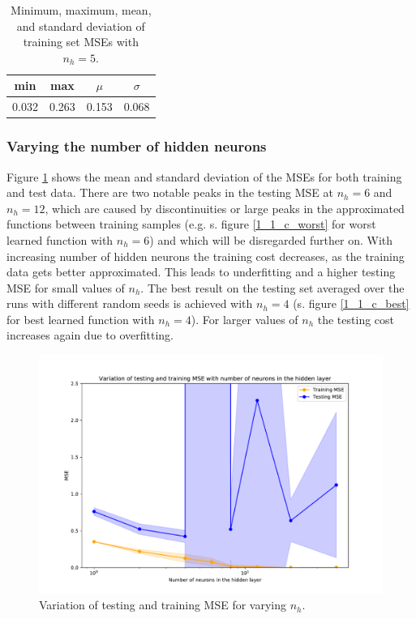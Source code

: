 \documentclass{article}
\begin{document}
\begin{table}[!ht]
\centering
\begin{tabular}{|c|c|c|c|} \hline
min & max 	& $\mu$ 	& $\sigma$ \\ \hline
0.032	& 0.263		& 0.153		& 0.068  \\ \hline
\end{tabular}
\caption{Minimum, maximum, mean, and standard deviation of training set MSEs with $n_h=5$.}
\label{1_1_b}
\end{table}

\clearpage

\subsubsection{Varying the number of hidden neurons}

Figure \ref{1_1_c_mse} shows the mean and standard deviation of the MSEs for both training and test data. There are two notable peaks in the testing MSE at $n_h=6$ and $n_h=12$, which are caused by discontinuities or large peaks in the approximated functions between training samples (e.g. s. figure \ref{1_1_c_worst} for worst learned function with $n_h=6$) and which will be disregarded further on. With increasing number of hidden neurons the training cost decreases, as the training data gets better approximated. This leads to underfitting and a higher testing MSE for small values of $n_h$. The best result on the testing set averaged over the runs with different random seeds is achieved with $n_h=4$ (s. figure \ref{1_1_c_best} for best learned function with $n_h=4$). For larger values of $n_h$ the testing cost increases again due to overfitting.

\begin{figure}[!ht]
\centering
\includegraphics[width=\textwidth]{./Figures/1_1_c_mse.pdf}
\caption{Variation of testing and training MSE for varying $n_h$.}
\label{1_1_c_mse}
\end{figure}
\end{document}
